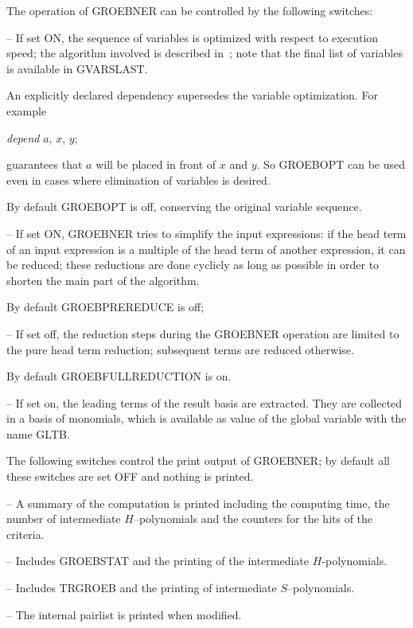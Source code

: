 The operation of GROEBNER can be controlled by the following
switches:
\begin{description}
\item[GROEBOPT] -- If set ON, the sequence of variables is optimized
with respect to execution speed; the algorithm involved is described
in~\cite{Boege:86}; note that the final list of variables is available in
GVARSLAST.

An explicitly declared dependency supersedes the
variable optimization. For example
\begin{center}
{\it depend} $a$, $x$, $y$;
\end{center}
guarantees that $a$ will be placed in front of $x$ and $y$. So
GROEBOPT can be used even in cases where elimination of variables is
desired.

By default GROEBOPT is off, conserving the original variable
sequence.

\item[GROEBPREREDUCE] -- If set ON, GROEBNER tries to simplify the
input expressions: if the head term of an input expression is a
multiple of the head term of another expression, it can be reduced;
these reductions are done cyclicly as long as possible in order to
shorten the main part of the algorithm.

By default GROEBPREREDUCE is off;

\item[GROEBFULLREDUCTION] -- If set off, the reduction steps during
the \linebreak[4] GROEBNER operation are limited to the pure head
term reduction; subsequent terms are reduced otherwise.

By default GROEBFULLREDUCTION is on.

\item[GLTBASIS] -- If set on, the leading terms of the result basis are
extracted. They are collected in a basis of monomials, which is
available as value of the global variable with the name GLTB.
\end{description}
The following switches control the print output of GROEBNER; by
default all these switches are set OFF and nothing is printed.
\begin{description}
\item[GROEBSTAT] -- A summary of the computation is printed
including the computing time, the number of intermediate
$H$--polynomials and the counters for the hits of the criteria.

\item[TRGROEB] -- Includes GROEBSTAT and the printing of the
intermediate $H$-polynomials.

\item[TRGROEBS] -- Includes TRGROEB and the printing of
intermediate $S$--poly\-nomials.

\item[TRGROEB1] -- The internal pairlist is printed when modified.
\end{description}

